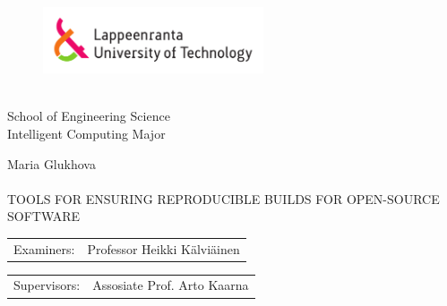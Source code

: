 
\thispagestyle{empty} 
\setlength{\parindent}{0pt}
\begin{figure}
\includegraphics[width=65mm]{./figs/Merkki_Logo_CMYK}\\
\end{figure}
~\\
School of Engineering Science\\
Intelligent Computing Major\\


\vspace{60mm}

{\sffamily\large Maria Glukhova\\
\\
\MakeUppercase{\Large Tools for Ensuring Reproducible Builds for Open-Source Software}}\\



\begin{tabular}{l p{11.0cm}}  
  
Examiners: & Professor \foreignlanguage{finnish}{Heikki Kälviäinen}\\

\end {tabular}

\begin{tabular}{l p{11.0cm}}  
  
Supervisors: & Assosiate Prof. Arto Kaarna\\

\end {tabular}






\pagebreak

